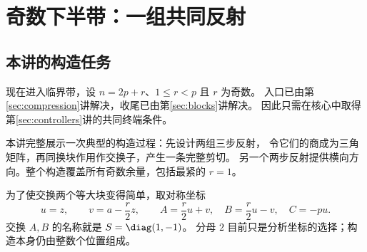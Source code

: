 \chapter{奇数下半带：一组共同反射}\label{ch:odd}

\section{本讲的构造任务}
现在进入临界带，设 $n=2p+r$、$1\le r<p$ 且 $r$ 为奇数。
入口已由第\ref{sec:compression}讲解决，收尾已由第\ref{sec:blocks}讲解决。
因此只需在核心中取得第\ref{sec:controllers}讲的共同终端条件。

本讲完整展示一次典型的构造过程：先设计两组三步反射，
令它们的商成为三角矩阵，再同换块作用作交换子，产生一条完整剪切。
另一个两步反射提供横向方向。整个构造覆盖所有奇数余量，包括最紧的 $r=1$。

为了使交换两个等大块变得简单，取对称坐标
\[
u=z,\qquad v=a-\frac r2z,
\qquad A=\frac r2u+v,\quad B=\frac r2u-v,\quad C=-pu.
\]
交换 $A,B$ 的名称就是 $S=\diag(1,-1)$。
分母 $2$ 目前只是分析坐标的选择；构造本身仍由整数个位置组成。

